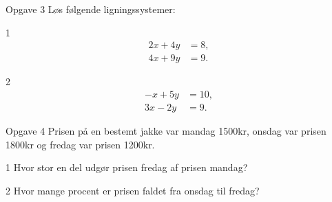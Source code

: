 \documentclass[12pt,x11names,a4paper]{article}
\begin{document}
\begin{opgavetekst}{Opgave 3}
	Løs følgende ligningssystemer:
\end{opgavetekst}
\begin{delopgave}{}{1}
	\begin{align*}
		2x+4y &= 8,\\
		4x+9y &= 9.
	\end{align*}
\end{delopgave}
\begin{delopgave}{}{2}
	\begin{align*}
		-x+5y &= 10,\\
		3x-2y &= 9.
	\end{align*}
\end{delopgave}
\begin{opgavetekst}{Opgave 4}
	Prisen på en bestemt jakke var mandag 1500kr, onsdag var prisen 1800kr og fredag var prisen 1200kr.
\end{opgavetekst}
	\begin{delopgave}{}{1}
		Hvor stor en del udgør prisen fredag af prisen mandag?
	\end{delopgave}
	\begin{delopgave}{}{2}
		Hvor mange procent er prisen faldet fra onsdag til fredag?
	\end{delopgave}
\end{document}
